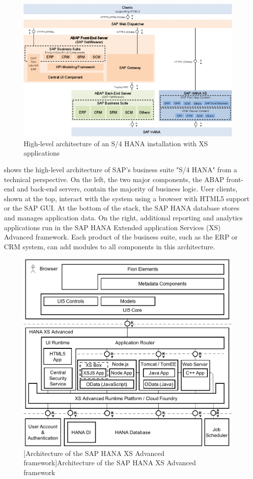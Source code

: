\begin{figure}
  \centering
  \includegraphics[width=.7\textwidth]{img/s4hana}
  \caption[High-level architecture of S/4 HANA]{High-level architecture of an S/4 HANA installation with XS applications~\cite{sap17:setup_of_sap_fiori}}
  \label{fig:s4hana}
\end{figure}


 shows the high-level architecture of SAP's business suite "S/4 HANA" from a technical perspective. 
On the left, the two major components, the ABAP front-end and back-end servers, contain the majority of business logic.
User clients, shown at the top, interact with the system using a browser with HTML5 support or the SAP GUI.
At the bottom of the stack, the SAP HANA database stores and manages application data.
On the right, additional reporting and analytics applications run in the SAP HANA Extended application Services (XS) Advanced framework.
Each product of the business suite, such as the ERP or CRM system, can add modules to all components in this architecture.

\begin{figure}
  \centering
  \includegraphics[width=.5\textwidth]{img/xsa}
  [Architecture of the SAP HANA XS Advanced framework]{Architecture of the SAP HANA XS Advanced framework~\cite{subatin17:xs_advanced_for_not}}
  \label{fig:xsa}
\end{figure}

